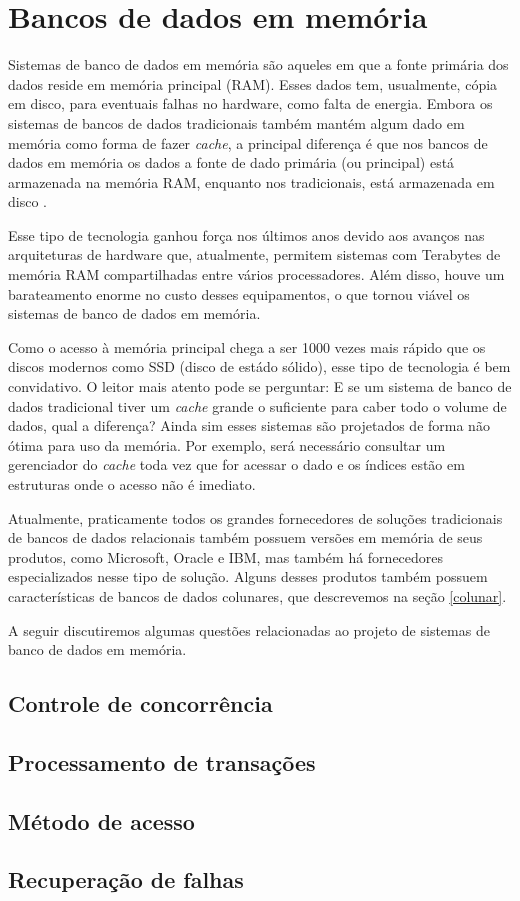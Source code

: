 \section{Bancos de dados em memória}

Sistemas de banco de dados em memória são aqueles em que a fonte primária dos dados reside em memória principal (RAM). Esses dados tem, usualmente, cópia em disco, para eventuais falhas no hardware, como falta de energia. Embora os sistemas de bancos de dados tradicionais também mantém algum dado em memória como forma de fazer \textit{cache}, a principal diferença é que nos bancos de dados em memória os dados a fonte de dado primária (ou principal) está armazenada na memória RAM, enquanto nos tradicionais, está armazenada em disco \cite{garcia1992main}.

Esse tipo de tecnologia ganhou força nos últimos anos devido aos avanços nas arquiteturas de hardware que, atualmente, permitem sistemas com Terabytes de memória RAM compartilhadas entre vários processadores. Além disso, houve um barateamento enorme no custo desses equipamentos, o que tornou viável os sistemas de banco de dados em memória. 

Como o acesso à memória principal chega a ser 1000 vezes mais rápido que os discos modernos como SSD (disco de estádo sólido), esse tipo de tecnologia é bem convidativo. O leitor mais atento pode se perguntar: E se um sistema de banco de dados tradicional tiver um \textit{cache} grande o suficiente para caber todo o volume de dados, qual a diferença? Ainda sim esses sistemas são projetados de forma não ótima para uso da memória. Por exemplo, será necessário consultar um gerenciador do \textit{cache} toda vez que for acessar o dado e os índices estão em estruturas onde o acesso não é imediato.

Atualmente, praticamente todos os grandes fornecedores de soluções tradicionais de bancos de dados relacionais também possuem versões em memória de seus produtos, como Microsoft, Oracle e IBM, mas também há fornecedores especializados nesse tipo de solução. Alguns desses produtos também possuem características de bancos de dados colunares, que descrevemos na seção \ref{colunar}.

A seguir discutiremos algumas questões relacionadas ao projeto de sistemas de banco de dados em memória.

\subsection{Controle de concorrência}

\subsection{Processamento de transações}
\subsection{Método de acesso}
\subsection{Recuperação de falhas}





